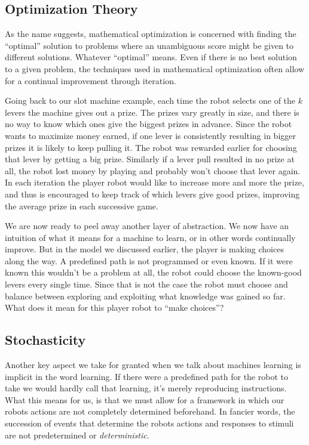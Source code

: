 \subsection{Optimization Theory}
As the name suggests, mathematical optimization is concerned 
with finding the ``optimal'' solution to problems where an 
unambiguous score might be given to different solutions.  
Whatever ``optimal'' means. Even if there is no best solution to 
a given problem, the techniques used in mathematical 
optimization often allow for a continual improvement through 
iteration.

Going back to our slot machine example, each time the robot 
selects one of the $k$ levers the machine gives out a prize. The 
prizes vary greatly in size, and there is no way to know which 
ones give the biggest prizes in advance. Since the robot wants 
to maximize money earned, if one lever is consistently resulting 
in bigger prizes it is likely to keep pulling it. The robot was 
rewarded earlier for choosing that lever by getting a big prize.  
Similarly if a lever pull resulted in no prize at all, the robot 
lost money by playing and probably won't choose that lever 
again. In each iteration the player robot would like to increase 
more and more the prize, and thus is encouraged to keep track of 
which levers give good prizes, improving the average prize in 
each successive game.

We are now ready to peel away another layer of abstraction.  We 
now have an intuition of what it means for a machine to learn, 
or in other words continually improve. But in the model we 
discussed earlier, the player is making choices along the way. A 
predefined path is not programmed or even known. If it were 
known this wouldn't be a problem at all, the robot could choose 
the known-good levers every single time. Since that is not the 
case the robot must choose and balance between exploring and 
exploiting what knowledge was gained so far. What does it mean 
for this player robot to ``make choices''?

\subsection{Stochasticity}
Another key aspect we take for granted when we talk about 
machines learning is implicit in the word learning. If there 
were a predefined path for the robot to take we would hardly 
call that learning, it's merely reproducing instructions.  What 
this means for us, is that we must allow for a framework in 
which our robots actions are not completely determined 
beforehand. In fancier words, the succession of events that 
determine the robots actions and responses to stimuli are not 
predetermined or \textit{deterministic}.


